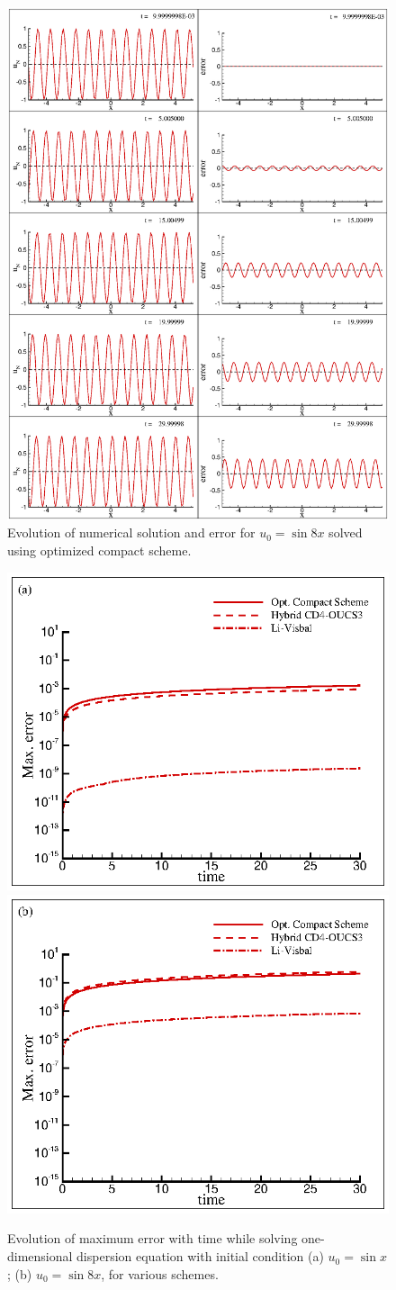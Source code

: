 \begin{figure}[!h]
\center
\includegraphics[width=0.8\linewidth]{Fig_9}
\caption{Evolution of numerical solution and error for $u_0=\sin 8x$ solved using optimized compact scheme.}
\label{fig:mid1}
\end{figure}

\begin{figure}
\center
\includegraphics[width=0.48\linewidth]{Fig_10a}
\includegraphics[width=0.48\linewidth]{Fig_10b}
\caption{Evolution of maximum error with time while solving one-dimensional dispersion equation with initial condition (a) $u_0=\sin x$ ; (b) $u_0=\sin 8x$, for various schemes.}
\label{fig:phase_err}
\end{figure}

